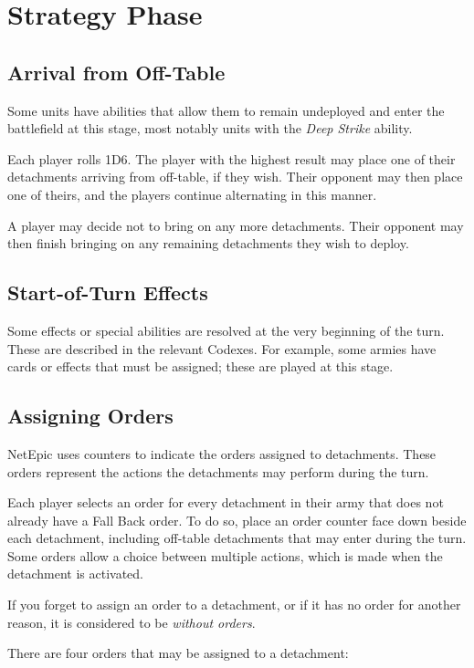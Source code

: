 \section{Strategy Phase}
\subsection{Arrival from Off-Table}

Some units have abilities that allow them to remain undeployed and enter the battlefield at this stage, most notably units with the \textit{Deep Strike} ability.

Each player rolls 1D6. The player with the highest result may place one of their detachments arriving from off-table, if they wish. Their opponent may then place one of theirs, and the players continue alternating in this manner.

A player may decide not to bring on any more detachments. Their opponent may then finish bringing on any remaining detachments they wish to deploy.

\subsection{Start-of-Turn Effects}

Some effects or special abilities are resolved at the very beginning of the turn. These are described in the relevant Codexes. For example, some armies have cards or effects that must be assigned; these are played at this stage.

\subsection{Assigning Orders}

NetEpic uses counters to indicate the orders assigned to detachments. These orders represent the actions the detachments may perform during the turn.

Each player selects an order for every detachment in their army that does not already have a Fall Back order. To do so, place an order counter face down beside each detachment, including off-table detachments that may enter during the turn. Some orders allow a choice between multiple actions, which is made when the detachment is activated.

If you forget to assign an order to a detachment, or if it has no order for another reason, it is considered to be \textit{without orders}.

There are four orders that may be assigned to a detachment:

